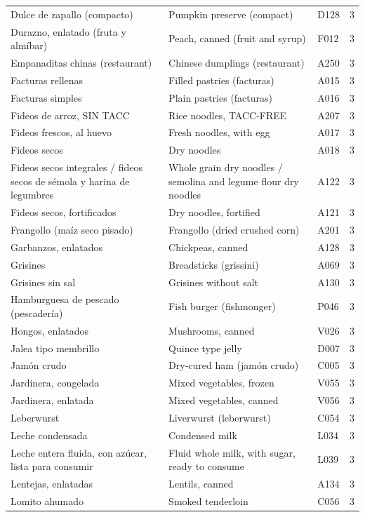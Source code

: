 {\begin{longtable}{p{4.3cm}p{5.5cm}p{1.5cm}p{0.7cm}}
Dulce de zapallo (compacto) & Pumpkin preserve (compact) & D128 & 3\\
Durazno, enlatado (fruta y almíbar) & Peach, canned (fruit and syrup) & F012 & 3\\
Empanaditas chinas (restaurant) & Chinese dumplings (restaurant) & A250 & 3\\
Facturas rellenas & Filled pastries (facturas) & A015 & 3\\
Facturas simples & Plain pastries (facturas) & A016 & 3\\
Fideos de arroz, SIN TACC & Rice noodles, TACC-FREE & A207 & 3\\
Fideos frescos, al huevo & Fresh noodles, with egg & A017 & 3\\
Fideos secos & Dry noodles & A018 & 3\\
Fideos secos integrales / fideos secos de sémola y harina de legumbres & Whole grain dry noodles / semolina and legume flour dry noodles & A122 & 3\\
Fideos secos, fortificados & Dry noodles, fortified & A121 & 3\\
Frangollo (maíz seco pisado) & Frangollo (dried crushed corn) & A201 & 3\\
Garbanzos, enlatados & Chickpeas, canned & A128 & 3\\
Grisines & Breadsticks (grissini) & A069 & 3\\
Grisines sin sal & Grisines without salt & A130 & 3\\
Hamburguesa de pescado (pescadería) & Fish burger (fishmonger) & P046 & 3\\
Hongos, enlatados & Mushrooms, canned & V026 & 3\\
Jalea tipo membrillo & Quince type jelly & D007 & 3\\
Jamón crudo & Dry-cured ham (jamón crudo) & C005 & 3\\
Jardinera, congelada & Mixed vegetables, frozen & V055 & 3\\
Jardinera, enlatada & Mixed vegetables, canned & V056 & 3\\
Leberwurst & Liverwurst (leberwurst) & C054 & 3\\
Leche condensada & Condensed milk & L034 & 3\\
Leche entera fluida, con azúcar, lista para consumir & Fluid whole milk, with sugar, ready to consume & L039 & 3\\
Lentejas, enlatadas & Lentils, canned & A134 & 3\\
Lomito ahumado & Smoked tenderloin & C056 & 3\\

\end{longtable}}
